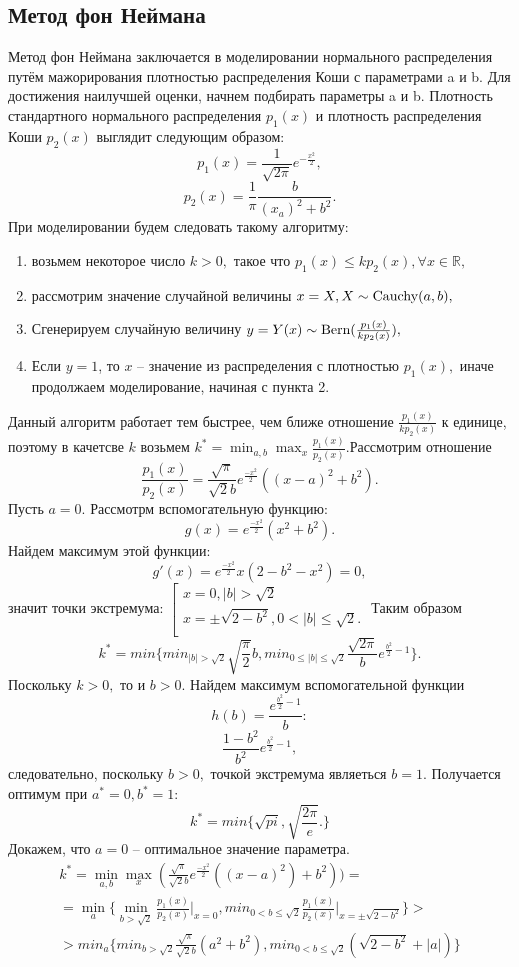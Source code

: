 \documentclass[11pt]{article}
\newcommand{\bern}{\normalfont{\text{Bern}}}
\newcommand{\cauchy}{\normalfont{\text{Cauchy}}}
\numberwithin{equation}{section}
\begin{document}
\subsection{Метод фон Неймана}
Метод фон Неймана заключается в моделировании нормального распределения путём мажорирования плотностью распределения Коши с параметрами a и b. Для достижения наилучшей оценки, начнем подбирать параметры a и b.
Плотность стандартного нормального распределения $p_1(x)$ и плотность распределения Коши $p_2(x)$ выглядит следующим образом:
$$ p_1(x) = \frac{1}{\sqrt{2\pi}}e^{-\frac{x^2}{2}},$$
$$ p_2(x) = \frac{1}{\pi} \frac{b}{(x_a)^2+b^2}.$$
При моделировании будем следовать такому алгоритму:
\begin{enumerate}
  \item возьмем некоторое число $k > 0,$ такое что $p_1(x)\leq kp_2(x), \forall x \in \mathbb{R},$
  \item рассмотрим значение случайной величины $x=X, X \sim \cauchy (a,b), $
  \item Сгенерируем случайную величину $y = Y(x) \sim \bern(\frac{p_1(x)}{kp_2(x)}),$
  \item Если $y=1$, то $x$ -- значение из распределения с плотностью $p_1(x),$ иначе продолжаем моделирование, начиная с пункта 2. 
\end{enumerate}
Данный алгоритм работает тем быстрее, чем ближе отношение $\frac{p_1(x)}{kp_2(x)}$ к единице, поэтому в качетсве $k$
возьмем $k^* = \min_{a,b} \max_{x} \frac{p_1(x)}{p_2(x)}.$Рассмотрим отношение 
$$\frac{p_1(x)}{p_2(x)} = \frac{\sqrt{\pi}}{\sqrt{2}b} e^{\frac{-x^2}{2}}((x-a)^2+b^2).$$ 
Пусть $a=0.$ Рассмотрм вспомогательную функцию:
$$g(x) = e^{\frac{-x^2}{2}}(x^2+b^2).$$
Найдем максимум этой функции:
$$ g'(x) =  e^{\frac{-x^2}{2}} x (2-b^2-x^2)=0,$$
значит точки экстремума:
$\left[ 
      \begin{gathered} 
        x=0, |b| > \sqrt{2} \\ 
        x = \pm \sqrt{2-b^2}, 0<|b|\leq \sqrt{2}. \\ 
      \end{gathered} 
\right.$
Таким образом 
$$ k^* = min \{ min_{|b|>\sqrt{2}} \sqrt{\frac{\pi}{2}}b, min_{0\leq |b| \leq \sqrt{2}} \frac{\sqrt{2\pi}}{b}e^{\frac{b^2}{2}-1} \}.$$
Поскольку $k>0,$ то и $b>0.$ Найдем максимум вспомогательной функции 
$$h(b) = \frac{e^{\frac{b^2}{2}-1}}{b}:$$
$$\frac{1-b^2}{b^2}e^{\frac{b^2}{2}-1},$$
следовательно, поскольку $b>0,$ точкой экстремума являеться $b=1.$
Получается оптимум при $a^*=0,b^*=1:$
$$ k^* = min \{ \sqrt{pi}, \sqrt{\frac{2\pi}{e}}.  \}$$
Докажем, что $a=0$ -- оптимальное значение параметра.
\begin{eqnarray}
  k^* = \min_{a,b} \max_{x} ( \frac{\sqrt{\pi}}{\sqrt{2}b}e^{\frac{-x^2}{2}} ((x-a)^2)+b^2) )=\\
  =\min_{a} \{  \min_{b>\sqrt{2}} \frac{p_1(x)}{p_2(x)} \bigg|_{x=0}, min_{0<b\leq \sqrt{2}} \frac{p_1(x)}{p_2(x)} \bigg|_{x=\pm \sqrt{2-b^2}}   \} > \\
  > min_{a} \{ min_{b>\sqrt{2}} \frac{\sqrt{\pi}}{\sqrt{2}b} (a^2+b^2), min_{0<b\leq \sqrt{2}} (\sqrt{2-b^2} + |a|)        \}
\end{eqnarray}
\end{document}
